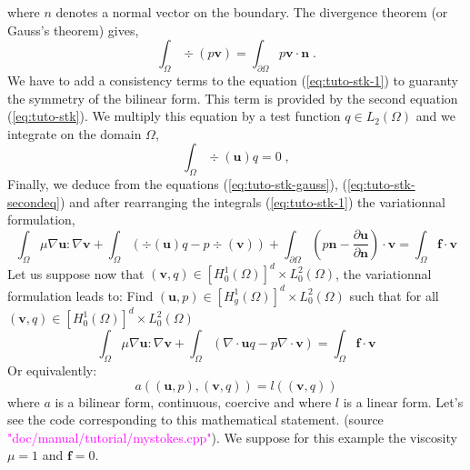 %
where $n$ denotes a normal vector on the boundary.
The divergence theorem (or Gauss's theorem) gives,
%
\begin{equation}
\int_\Omega \div(p \mathbf v) = \int_{\partial\Omega} p \mathbf v\cdot \mathbf n \;.
\label{eq:tuto-stk-gauss}
\end{equation}
%
We have to add a consistency terms to the equation (\ref{eq:tuto-stk-1}) to
guaranty the symmetry of the bilinear form.
This term is provided by the second equation (\ref{eq:tuto-stk}). We multiply this equation
by a test function $q\in L_2(\Omega)$ and we integrate on the domain $\Omega$,
%
\begin{equation}
\int_{\Omega} \div(\mathbf u) q = 0 \;,
\label{eq:tuto-stk-secondeq}
\end{equation}
%
Finally, we deduce from the equations (\ref{eq:tuto-stk-gauss}), (\ref{eq:tuto-stk-secondeq})
and after rearranging the integrals (\ref{eq:tuto-stk-1}) the variationnal formulation,
%
\begin{equation}
\int_\Omega \mu \nabla \mathbf u :\nabla \mathbf v
+\int_\Omega \left( \div(\mathbf u) q - p \div(\mathbf v) \right)
+
    \int_{\partial\Omega} \left( p \mathbf n - 
 \frac{\partial \mathbf u}{\partial \mathbf n}\right)
     \cdot \mathbf v
=\int_\Omega \mathbf f \cdot \mathbf v 
\label{eq:tuto-stk-varform}
\end{equation}
%
Let us suppose now that $(\mathbf v,q) \in [H_0^1(\Omega)]^d \times L_0^2(\Omega)$, the variationnal formulation leads to:
Find $(\mathbf{u},p)\in [H_g^1(\Omega)]^d\times L_0^2(\Omega)$ such that for all $(\mathbf{v},q) \in [H_0^1(\Omega)]^d \times L_0^2(\Omega)$
\begin{equation}
\int_\Omega \mu \nabla \mathbf{u} :\nabla \mathbf{v}
+\int_\Omega \left( \nabla\cdot\mathbf{u} q - p \nabla\cdot\mathbf{v} \right)
=\int_\Omega \mathbf{f} \cdot \mathbf{v}
\end{equation}
Or equivalently:
\begin{equation}
  a((\mathbf{u},p),(\mathbf{v},q)) = l((\mathbf{v},q))
\end{equation}
where $a$ is a bilinear form, continuous, coercive and where $l$ is a linear form.
Let's see the \feel code corresponding to this mathematical statement.
(source \textcolor{magenta}{"doc/manual/tutorial/mystokes.cpp"}).
We suppose for this example the viscosity $\mu=1$ and $\mathbf f = 0$.
%
\vspace{2mm}

\vspace{2mm}
%

